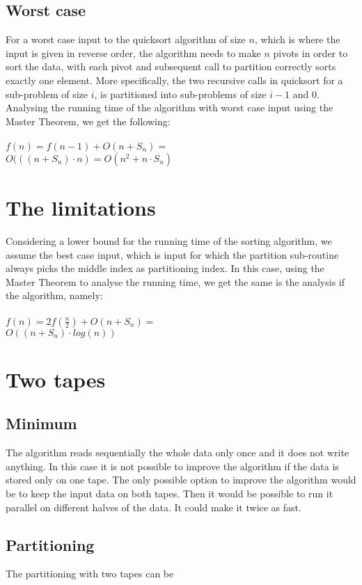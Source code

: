 \documentclass{article}
\begin{document}
\subsection*{Worst case}
For a worst case input to the quicksort algorithm of size $n$, which is where the input is given in reverse order, the algorithm needs to make $n$ pivots in order to sort the data, with each pivot and subsequent call to partition correctly sorts exactly one element. More specifically, the two recursive calls in quicksort for a sub-problem of size $i$, is partitioned into sub-problems of size $i-1$ and $0$. \\
Analysing the running time of the algorithm with worst case input using the Master Theorem, we get the following:\\\\
$f(n) = f(n-1) + O(n + S_n) = $\\
$O(((n + S_n) \cdot n) = O(n^2 + n \cdot S_n)$

\section*{The limitations}
Considering a lower bound for the running time of the sorting algorithm, we assume the best case input, which is input for which the partition sub-routine always picks the middle index as partitioning index. In this case, using the Master Theorem to analyse the running time, we get the same is the analysis if the algorithm, namely:\\\\
$f(n) = 2f(\frac{n}{2}) + O(n + S_n) = $\\
$O((n + S_n) \cdot log(n))$

\section*{Two tapes}

\subsection*{Minimum}
The algorithm reads sequentially the whole data only once and it does not write anything. In this case it is not possible to improve the algorithm if the data is stored only on one tape.
The only possible option to improve the algorithm would be to keep the input data on both tapes. Then it would be possible to run it parallel on different halves of the data. It could make it twice as fast.

\subsection*{Partitioning}
The partitioning with two tapes can be 
\end{document}
